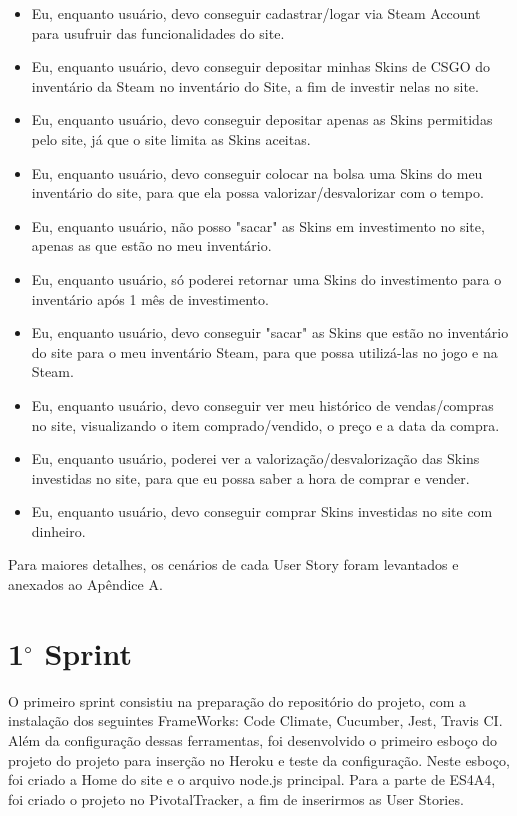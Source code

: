 \begin{itemize}
\item Eu, enquanto usuário, devo conseguir cadastrar/logar via Steam Account para usufruir das 
funcionalidades do site.

\item Eu, enquanto usuário, devo conseguir depositar minhas Skins de CSGO do inventário da Steam no 
inventário do Site, a fim de investir nelas no site.

\item Eu, enquanto usuário, devo conseguir depositar apenas as Skins permitidas pelo site, já que o 
site limita as Skins aceitas.

\item Eu, enquanto usuário, devo conseguir colocar na bolsa uma Skins do meu inventário do site, para 
que ela possa valorizar/desvalorizar com o tempo.

\item Eu, enquanto usuário, não posso "sacar" as Skins em investimento no site, apenas as que estão no 
meu inventário.

\item Eu, enquanto usuário, só poderei retornar uma Skins do investimento para o inventário após 1 mês 
de investimento.

\item Eu, enquanto usuário, devo conseguir "sacar" as Skins que estão no inventário do site para o meu 
inventário Steam, para que possa utilizá-las no jogo e na Steam.

\item Eu, enquanto usuário, devo conseguir ver meu histórico de vendas/compras no site, visualizando o 
item comprado/vendido, o preço e a data da compra.

\item Eu, enquanto usuário, poderei ver a valorização/desvalorização das Skins investidas no site, para 
que eu possa saber a hora de comprar e vender.

\item Eu, enquanto usuário, devo conseguir comprar Skins investidas no site com dinheiro.
\end{itemize}

Para maiores detalhes, os cenários de cada User Story foram levantados e anexados ao Apêndice A.

\section{1$^{\circ}$ Sprint}
O primeiro sprint consistiu na preparação do repositório do projeto, com a instalação dos seguintes
FrameWorks: Code Climate, Cucumber, Jest, Travis CI. Além da configuração dessas ferramentas,
foi desenvolvido o primeiro esboço do projeto do projeto para inserção no Heroku e teste da configuração.
Neste esboço, foi criado a Home do site e o arquivo node.js principal. Para a parte de ES4A4,
foi criado o projeto no PivotalTracker, a fim de inserirmos as User Stories.

